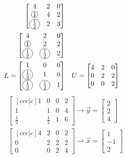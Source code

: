 \documentclass{article}
\newcommand*\circled[1]{\tikz[baseline=(char.base)]{
    \node[shape=circle,draw,inner sep=0.5pt] (char) {#1};}}
\begin{document}
\begin{align}
    \begin{bmatrix}
        4 & 2 & 0 \\
        \circled{\(1\)} & 4 & 2 \\
        \circled{\(\frac{1}{2}\)} & 2 & 3
    \end{bmatrix} \\
    \begin{bmatrix}
        4 & 2 & 0 \\
        \circled{\(1\)} & 2 & 2 \\
        \circled{\(\frac{1}{2}\)} & \circled{\(\frac{1}{2}\)} & 2
    \end{bmatrix} \\
    L = \begin{bmatrix}
        1 & 0 & 0 \\
        \circled{\(\frac{1}{4}\)} & 1 & 0 \\
        \circled{\(\frac{1}{2}\)} & \circled{\(\frac{1}{2}\)} & 1
    \end{bmatrix} & \quad
    U = \begin{bmatrix}
        4 & 2 & 0 \\
        0 & 2 & 2 \\
        0 & 0 & 2
    \end{bmatrix}
\end{align}
\begin{align}
    \begin{bmatrix}[ccc|c]
        1 & 0 & 0 & 2 \\
        1 & 1 & 0 & 4 \\
        \frac{1}{2} & \frac{1}{2} & 1 & 6
    \end{bmatrix}
    \rightarrow
    \overrightarrow{y} = \begin{bmatrix}
        2 \\
        2 \\
        4
    \end{bmatrix} \\
    \begin{bmatrix}[ccc|c]
        4 & 2 & 0 & 2\\
        0 & 2 & 2 & 2\\
        0 & 0 & 2 & 4
    \end{bmatrix}
    \rightarrow
    \overrightarrow{x} = \begin{bmatrix}
        1 \\
        -1 \\
        2
    \end{bmatrix}
\end{align}
\end{document}
